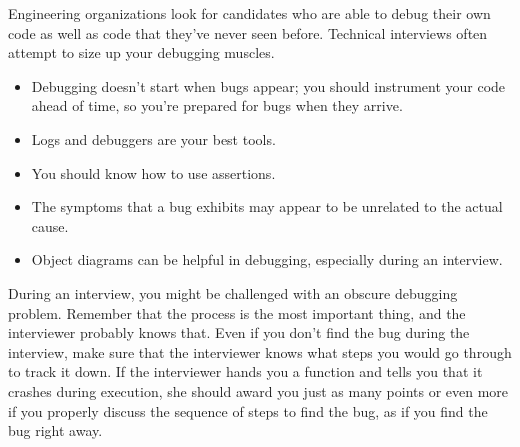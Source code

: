 Engineering organizations look for candidates who are able to debug their own code as well as code that they’ve never seen before. Technical interviews often attempt to size up your debugging muscles.


\begin{itemize}
\item
Debugging doesn’t start when bugs appear; you should instrument your code ahead of time, so you’re prepared for bugs when they arrive.

\item
Logs and debuggers are your best tools.

\item
You should know how to use assertions.

\item
The symptoms that a bug exhibits may appear to be unrelated to the actual cause.

\item
Object diagrams can be helpful in debugging, especially during an interview.
\end{itemize}


During an interview, you might be challenged with an obscure debugging problem. Remember that the process is the most important thing, and the interviewer probably knows that. Even if you don’t find the bug during the interview, make sure that the interviewer knows what steps you would go through to track it down. If the interviewer hands you a function and tells you that it crashes during execution, she should award you just as many points or even more if you properly discuss the sequence of steps to find the bug, as if you find the bug right away.
